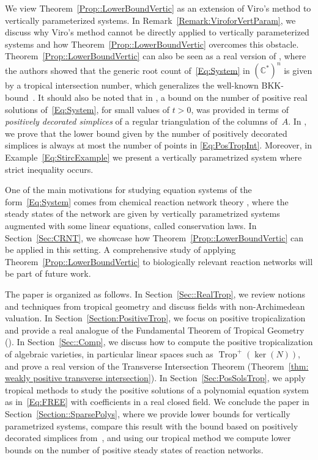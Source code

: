 \documentclass{article}
\theoremstyle{definition}
\DeclareMathOperator{\Trop}{Trop}
\begin{document}
We view Theorem~\ref{Prop::LowerBoundVertic} as an extension of Viro's method \cite{Viro_Dissertation, Bernd::Patchworking} to vertically parameterized systems. In Remark~\ref{Remark:ViroforVertParam}, we discuss why Viro's method cannot be directly applied to vertically parameterized systems and how Theorem~\ref{Prop::LowerBoundVertic} overcomes this obstacle. Theorem~\ref{Prop::LowerBoundVertic} can also be seen as a real version of \cite[Proposition 6.5]{RenHelminck}, where the authors showed that the generic root count of~\eqref{Eq:System} in  $(\mathbb{C}^*)^n$ is given by a tropical intersection number, which generalizes the well-known BKK-bound~\cite{Bernstein,Kushnirenko}. It should also be noted that in \cite{PolyhedralMethodSparsePositive}, a bound on the number of positive real solutions of~\eqref{Eq:System}, for small values of $t > 0$, was provided in terms of \emph{positively decorated simplices} of a regular triangulation of the columns of~$A$. In , we prove that the lower bound given by the number of positively decorated simplices is always at most the number of points in \eqref{Eq:PosTropInt}. Moreover, in Example~\ref{Eq:StircExample}  we present a vertically parametrized system where strict inequality occurs.

One of the main motivations for studying equation systems of the form~\eqref{Eq:System} comes from chemical reaction network theory \cite{DickensteinInvitation, FeliuRoleofAlg}, where the steady states of the network are given by vertically parametrized systems augmented with some linear equations, called conservation laws. In Section~\ref{Sec:CRNT}, we showcase how Theorem~\ref{Prop::LowerBoundVertic} can be applied in this setting. A comprehensive study of applying Theorem~\ref{Prop::LowerBoundVertic} to biologically relevant reaction networks will be part of future work.

The paper is organized as follows. In Section~\ref{Sec::RealTrop}, we review notions and techniques from tropical geometry and discuss fields with non-Archimedean valuation. In Section~\ref{Section:PositiveTrop}, we focus on positive tropicalization and provide a real analogue of the Fundamental Theorem of Tropical Geometry (). In Section~\ref{Sec::Comp}, we discuss how to compute the positive tropicalization of algebraic varieties, in particular linear spaces such as $\Trop^+(\ker(N))$, and prove a real version of the Transverse Intersection Theorem (Theorem~\ref{thm: weakly positive transverse intersection}). In Section~\ref{Sec:PosSolsTrop}, we apply tropical methods to study the positive solutions of a polynomial equation system as in~\eqref{Eq:FREE} with coefficients in a real closed field. We conclude the paper in Section~\ref{Section::SparsePolys}, where we provide lower bounds for vertically parametrized systems, compare this result with the bound based on positively decorated simplices from~\cite{PolyhedralMethodSparsePositive}, and using our tropical method we compute lower bounds on the number of positive steady states of reaction networks.
\end{document}
